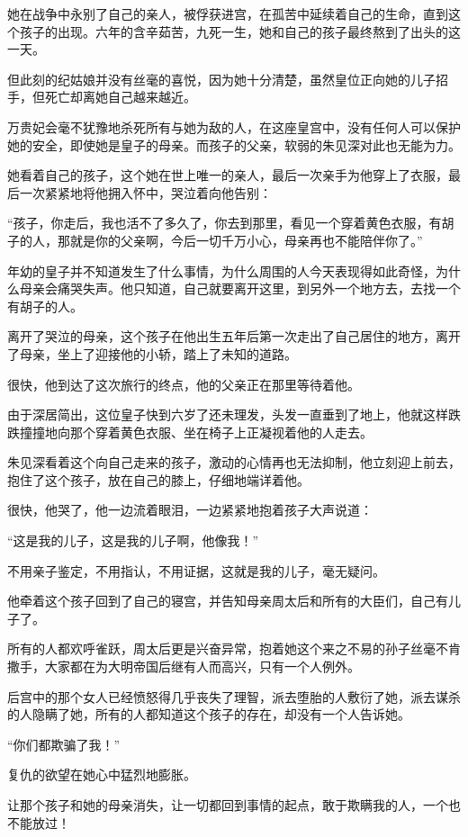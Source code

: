\begin{multicols}{\theparacolNo}
		她在战争中永别了自己的亲人，被俘获进宫，在孤苦中延续着自己的生命，直到这个孩子的出现。六年的含辛茹苦，九死一生，她和自己的孩子最终熬到了出头的这一天。

		但此刻的纪姑娘并没有丝毫的喜悦，因为她十分清楚，虽然皇位正向她的儿子招手，但死亡却离她自己越来越近。

		万贵妃会毫不犹豫地杀死所有与她为敌的人，在这座皇宫中，没有任何人可以保护她的安全，即使她是皇子的母亲。而孩子的父亲，软弱的朱见深对此也无能为力。

		她看着自己的孩子，这个她在世上唯一的亲人，最后一次亲手为他穿上了衣服，最后一次紧紧地将他拥入怀中，哭泣着向他告别：

		“孩子，你走后，我也活不了多久了，你去到那里，看见一个穿着黄色衣服，有胡子的人，那就是你的父亲啊，今后一切千万小心，母亲再也不能陪伴你了。”

		年幼的皇子并不知道发生了什么事情，为什么周围的人今天表现得如此奇怪，为什么母亲会痛哭失声。他只知道，自己就要离开这里，到另外一个地方去，去找一个有胡子的人。

		离开了哭泣的母亲，这个孩子在他出生五年后第一次走出了自己居住的地方，离开了母亲，坐上了迎接他的小轿，踏上了未知的道路。

		很快，他到达了这次旅行的终点，他的父亲正在那里等待着他。

		由于深居简出，这位皇子快到六岁了还未理发，头发一直垂到了地上，他就这样跌跌撞撞地向那个穿着黄色衣服、坐在椅子上正凝视着他的人走去。

		朱见深看着这个向自己走来的孩子，激动的心情再也无法抑制，他立刻迎上前去，抱住了这个孩子，放在自己的膝上，仔细地端详着他。

		很快，他哭了，他一边流着眼泪，一边紧紧地抱着孩子大声说道：

		“这是我的儿子，这是我的儿子啊，他像我！”

		不用亲子鉴定，不用指认，不用证据，这就是我的儿子，毫无疑问。

		他牵着这个孩子回到了自己的寝宫，并告知母亲周太后和所有的大臣们，自己有儿子了。

		所有的人都欢呼雀跃，周太后更是兴奋异常，抱着她这个来之不易的孙子丝毫不肯撒手，大家都在为大明帝国后继有人而高兴，只有一个人例外。

		后宫中的那个女人已经愤怒得几乎丧失了理智，派去堕胎的人敷衍了她，派去谋杀的人隐瞒了她，所有的人都知道这个孩子的存在，却没有一个人告诉她。

		“你们都欺骗了我！”

		复仇的欲望在她心中猛烈地膨胀。

		让那个孩子和她的母亲消失，让一切都回到事情的起点，敢于欺瞒我的人，一个也不能放过！


\end{multicols}
